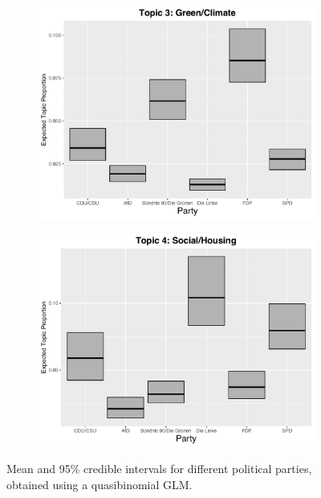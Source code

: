 \begin{figure}[h!]
  \centering
  \captionsetup{justification=centering,margin=2cm}
  \begin{subfigure}[b]{0.49\linewidth}
    \includegraphics[width=\linewidth]{../plots/4_4/quasi_t3_cat.pdf}
  \end{subfigure}
  \begin{subfigure}[b]{0.49\linewidth}
    \includegraphics[width=\linewidth]{../plots/4_4/quasi_t4_cat.pdf}
  \end{subfigure}
  \caption{Mean and 95\% credible intervals for different political parties, obtained using a quasibinomial GLM.}
  \label{fig:coffee}
\end{figure}

